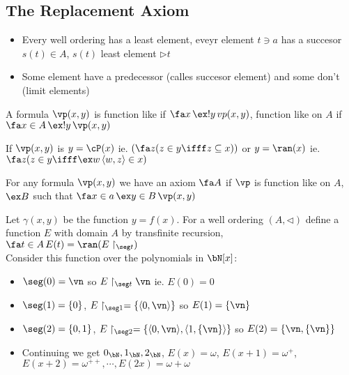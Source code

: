 
\subsection{The Replacement Axiom}

\begin{itemize}
    \item Every well ordering has a least element, eveyr element $t \ni a$ has a succesor $s(t) \in A$, $s(t)$ least element $\triangleright t$ 
    \item Some element have a predecessor (calles succesor element) and some don't (limit elements)
\end{itemize}

\begin{definition}
    A formula $\vp(x,y)$ is function like if $\fa x \, \ex ! y \, vp(x,y)$, function like on $A$ if $\fa x \in A \, \ex ! y \, \vp(x,y)$ 
\end{definition}

\begin{example}
    If $\vp(x,y)$ is $y = \cP(x)$ ie. $(\fa z (z \in y \ifff z \subseteq x))$ or $y = \ran(x)$ ie. $\fa z(z \in y \ifff \ex w \, \langle w, z \rangle \in x)$ 
\end{example}

\begin{axiom}
    For any formula $\vp(x,y)$ we have an axiom $\fa A$ if $\vp$ is function like on $A$, $\ex B$ such that $\fa x \in a \, \ex y \in B \, \vp(x,y)$ 
\end{axiom}

\noindent
Let $\gamma(x,y)$ be the function $y = f(x)$. For a well ordering $(A, \triangleleft)$ define a function $E$ with domain $A$ by transfinite recursion, $\fa t \in A \, E(t) = \ran(E \upharpoonright_{\seg t})$ \\
Consider this function over the polynomials in $\bN[x]$: 
\begin{itemize}
    \item $\seg(0) = \vn$ so $E \upharpoonright_{\seg t} \vn$ ie. $E(0)=0$ 
    \item $\seg(1) = \{0\}$, $E \upharpoonright_{\seg 1} = \{ \langle 0, \vn \rangle \}$ so $E(1) = \{ \vn\}$ 
    \item $\seg(2) = \{0,1\}$, $E \upharpoonright_{\seg 2} = \{\langle 0, \vn \rangle, \langle 1, \{\vn\} \rangle \}$ so $E(2)  = \{\vn, \{ \vn \}\}$ 
    \item Continuing we get $0_{\bN}, 1_{\bN}, 2_{\bN}$, $E(x) = \omega$, $E(x+1) = \omega^+$, $E(x+2)= \omega^{++}, \cdots, E(2x) = \omega + \omega$ 
\end{itemize}


